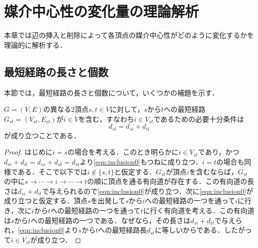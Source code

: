 \chapter{媒介中心性の変化量の理論解析}
本章では辺の挿入と削除によって各頂点の媒介中心性がどのように変化するかを理論的に解析する．

\section{最短経路の長さと個数}
本節では，最短経路の長さと個数について，いくつかの補題を示す．

\begin{lemma}
$G=(V,E)$の異なる2頂点$s,t \in V$に対して，$s$から$t$への最短経路$G_{st}=(V_{st},E_{st})$が$i \in V$を含む，すなわち$i \in V_{st}$であるための必要十分条件は
\begin{equation}
  d_{st}=d_{si}+d_{it}
  \label{eqn:inclusion0}
\end{equation}
が成り立つことである．
\label{lemma:1}
\end{lemma}
\begin{proof}
はじめに$i=s$の場合を考える．このとき明らかに$i \in V_{st}$であり，かつ$d_{si}+d_{it}=d_{ss}+d_{st}=d_{st}$より\eqref{eqn:inclusion0}もつねに成り立つ．$i=t$の場合も同様である．そこで以下では$i \not\in \{s,t\}$と仮定する．$G_{st}$が頂点$i$を含むならば，$G_{st}$の中に$s \rightarrow \cdots \rightarrow i \rightarrow \cdots \rightarrow t$の順に頂点を通る有向道が存在する．この有向道の長さは$d_{si}+d_{it}$で与えられるので\eqref{eqn:inclusion0}が成り立つ．次に\eqref{eqn:inclusion0}が成り立つと仮定する．頂点$s$を出発して$s$から$i$への最短経路の一つを通って$i$に行き，次に$i$から$t$への最短経路の一つを通って$t$に行く有向道を考える．この有向道は$s$から$t$への最短経路の一つである．なぜなら，その長さは$d_{si}+d_{it}$で与えられ，\eqref{eqn:inclusion0}より$s$から$t$への最短経路長$d_{st}$に等しいからである．したがって$i \in V_{st}$が成り立つ．
\end{proof}

